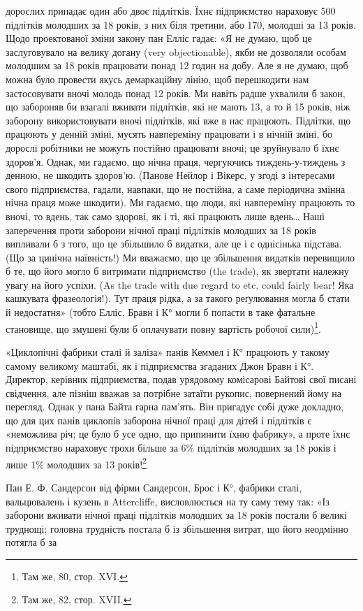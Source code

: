 \parcont{}  %
дорослих припадає один або двоє підлітків. Їхнє підприємство нараховує
500 підлітків молодших за 18 років, з них біля третини,
або 170, молодші за 13 років. Щодо проектованої зміни закону
пан Елліс гадає: «Я не думаю, щоб це заслуговувало на велику
догану (very objectionable), якби не дозволяли особам молодшим
за 18 років працювати понад 12 годин на добу. Але я не думаю,
щоб можна було провести якусь демаркаційну лінію, щоб перешкодити
нам застосовувати вночі молодь понад 12 років. Ми навіть
радше ухвалили б закон, що забороняв би взагалі вживати
підлітків, які не мають 13, а то й 15 років, ніж заборону використовувати
вночі підлітків, які вже в нас працюють. Підлітки,
що працюють у денній зміні, мусять навпереміну працювати і
в нічній зміні, бо дорослі робітники не можуть постійно працювати
вночі; це зруйнувало б їхнє здоров’я. Однак, ми гадаємо,
що нічна праця, чергуючись тиждень-у-тиждень з денною,
не шкодить здоров’ю. (Панове Нейлор і Вікерс, у згоді з інтересами
свого підприємства, гадали, навпаки, що не постійна, а
саме періодична змінна нічна праця може шкодити). Ми гадаємо,
що люди, які навпереміну працюють то вночі, то вдень, так само
здорові, як і ті, які працюють лише вдень\dots{} Наші заперечення
проти заборони нічної праці підлітків молодших за 18 років
випливали б з того, що це збільшило б видатки, але це і є однісінька
підстава. (Що за цинічна наївність!) Ми вважаємо, що це
збільшення видатків перевищило б те, що його могло б витримати
підприємство (the trade), як звертати належну увагу на його
успіхи. (As the trade with due regard to etc. could fairly bear!
Яка кашкувата фразеологія!). Тут праця рідка, а за такого реґулювання
могла б стати й недостатня» (тобто Елліс, Бравн і К°
могли б попасти в таке фатальне становище, що змушені були б
оплачувати повну вартість робочої сили)\footnote{
Там же, 80, стор. XVI.
}.

«Циклопічні фабрики сталі й заліза» панів Кеммел і К°
працюють у такому самому великому маштабі, як і підприємства
згаданих Джон Бравн і К°. Директор, керівник підприємства,
подав урядовому комісарові Байтові свої писані свідчення, але
пізніш вважав за потрібне затаїти рукопис, повернений йому на
перегляд. Однак у пана Байта гарна пам’ять. Він пригадує собі
дуже докладно, що для цих панів циклопів заборона нічної
праці для дітей і підлітків є «неможлива річ; це було б усе одно,
що припинити їхню фабрику», а проте їхнє підприємство нараховує
трохи більше за 6\% підлітків молодших за 18 років і лише
1\% молодших за 13 років!\footnote{
Там же, 82, стор. XVII.
}

Пан Е. Ф. Сандерсон від фірми Сандерсон, Брос і К°, фабрики
сталі, вальцювалень і кузень в Attercliffe, висловлюється на ту
саму тему так: «Із заборони вживати нічної праці підлітків молодших
за 18 років постали б великі труднощі; головна трудність
постала б із збільшення витрат, що його неодмінно потягла б за
\parbreak{}  %
